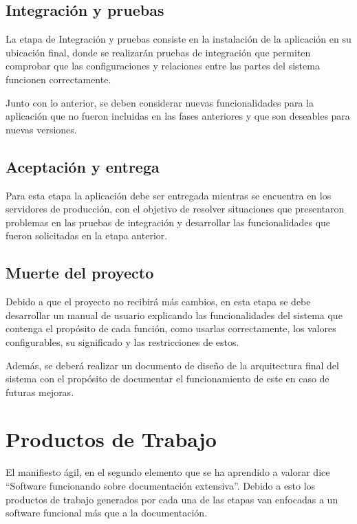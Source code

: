 \subsection{Integración y pruebas}

La etapa de Integración y pruebas consiste en la instalación de la aplicación en su ubicación final, donde se realizarán pruebas de integración que permiten comprobar que las configuraciones y relaciones entre las partes del sistema funcionen correctamente. 

Junto con lo anterior, se deben considerar nuevas funcionalidades para la aplicación que no fueron incluidas en las fases anteriores y que son deseables para nuevas versiones.

\subsection{Aceptación y entrega}

Para esta etapa la aplicación debe ser entregada mientras se encuentra en los servidores de producción, con el objetivo de resolver situaciones que presentaron problemas en las pruebas de integración y desarrollar las funcionalidades que fueron solicitadas en la etapa anterior. 

\subsection{Muerte del proyecto}

Debido a que el proyecto no recibirá más cambios, en esta etapa se debe desarrollar un manual de usuario explicando las funcionalidades del sistema que contenga el propósito de cada función, como usarlas correctamente, los valores configurables, su significado y las restricciones de estos.

Además, se deberá realizar un documento de diseño de la arquitectura final del sistema con el propósito de documentar el funcionamiento de este en caso de futuras mejoras. 

\section{Productos de Trabajo}

El manifiesto ágil, en el segundo elemento que se ha aprendido a valorar dice “Software funcionando sobre documentación extensiva”. Debido a esto los productos de trabajo generados por cada una de las etapas van enfocadas a un software funcional más que a la documentación.

